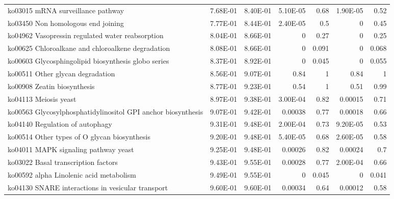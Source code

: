 {\begin{longtable}{ | l | r | r | r | r | r | r  | }
		ko03015 mRNA surveillance pathway & 7.68E-01 & 8.40E-01 & 5.10E-05 & 0.68 & 1.90E-05 & 0.52\\ 
		ko03450 Non homologous end joining & 7.77E-01 & 8.44E-01 & 2.40E-05 & 0.5 & 0 & 0.45\\ 
		ko04962 Vasopressin regulated water reabsorption & 8.04E-01 & 8.66E-01 & 0 & 0.27 & 0 & 0.25\\ 
		ko00625 Chloroalkane and chloroalkene degradation & 8.08E-01 & 8.66E-01 & 0 & 0.091 & 0 & 0.068\\ 
		ko00603 Glycosphingolipid biosynthesis globo series & 8.37E-01 & 8.92E-01 & 0 & 0.045 & 0 & 0.055\\ 
		ko00511 Other glycan degradation & 8.56E-01 & 9.07E-01 & 0.84 & 1 & 0.84 & 1\\ 
		ko00908 Zeatin biosynthesis & 8.77E-01 & 9.23E-01 & 0.54 & 1 & 0.51 & 0.99\\ 
		ko04113 Meiosis yeast & 8.97E-01 & 9.38E-01 & 3.00E-04 & 0.82 & 0.00015 & 0.71\\ 
		ko00563 Glycosylphosphatidylinositol GPI anchor biosynthesis & 9.07E-01 & 9.42E-01 & 0.00038 & 0.77 & 0.00018 & 0.66\\ 
		ko04140 Regulation of autophagy & 9.31E-01 & 9.48E-01 & 2.00E-04 & 0.73 & 9.20E-05 & 0.53\\ 
		ko00514 Other types of O glycan biosynthesis & 9.20E-01 & 9.48E-01 & 5.40E-05 & 0.68 & 2.60E-05 & 0.58\\ 
		ko04011 MAPK signaling pathway yeast & 9.25E-01 & 9.48E-01 & 0.00026 & 0.82 & 0.00024 & 0.7\\ 
		ko03022 Basal transcription factors & 9.43E-01 & 9.55E-01 & 0.00028 & 0.77 & 2.00E-04 & 0.66\\ 
		ko00592 alpha Linolenic acid metabolism & 9.49E-01 & 9.55E-01 & 0 & 0.045 & 0 & 0.041\\ 
		ko04130 SNARE interactions in vesicular transport & 9.60E-01 & 9.60E-01 & 0.00034 & 0.64 & 0.00012 & 0.58
		
	\end{longtable}
}






